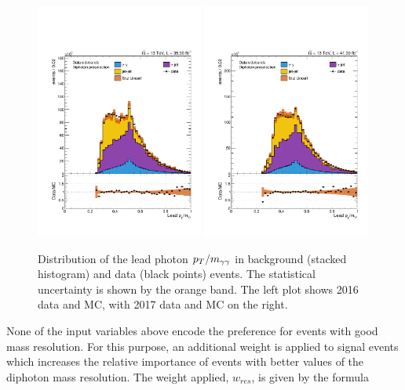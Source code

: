 \begin{figure}[hptb]
\centering
\includegraphics[width=0.49\textwidth]{Figures/Categorisation/leadptom_2016.pdf}
\includegraphics[width=0.49\textwidth]{Figures/Categorisation/leadptom_2017.pdf}
\caption{
  Distribution of the lead photon $p_T/m_{\gamma\gamma}$ in background (stacked histogram) 
  and data (black points) events.
  The statistical uncertainty is shown by the orange band.
  The left plot shows 2016 data and MC,
  with 2017 data and MC on the right.
}
\label{fig:cat_ptominput}
\end{figure}

None of the input variables above encode the preference for events with good mass resolution.
For this purpose, an additional weight is applied to signal events which increases the relative 
importance of events with better values of the diphoton mass resolution. 
The weight applied, $w_{res}$, is given by the formula

